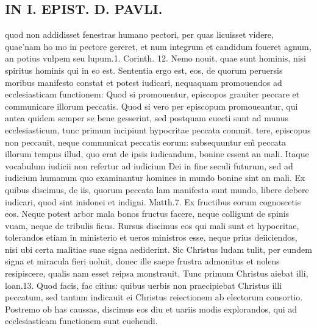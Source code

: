 \documentclass{article}
\begin{document}
\begin{pages}
\section*{IN I. EPIST. D. PAVLI. }
\marginpar{[ p.119 ]}\pstart quod non addidisset fenestras humano pectori, per quas licuisset videre, quae’nam ho mo in pectore gereret, et num integrum et candidum foueret agnum, an potius vulpem seu lupum.1. Corinth. 12. Nemo nouit, quae sunt hominis, nisi spiritus hominis qui in eo est. Sententia ergo est, eos, de quorum peruersis moribus manifesto constat et potest iudicari, nequaquam promouendos ad ecclesiasticam functionem: Quod si promouentur, episcopos grauiter peccare et communicare illorum peccatis. Quod si vero per episcopum promoueantur, qui antea quidem semper se bene gesserint, sed postquam euecti sunt ad munus ecclesiasticum, tunc primum incipiunt hypocritae peccata commit. tere, episcopus non peccauit, neque communicat peccatis eorum: subsequuntur em̃ peccata illorum tempus illud, quo erat de ipsis iudicandum, bonine essent an mali. Itaque vocabulum iudicii non refertur ad iudicium Dei in fine seculi futurum, sed ad iudicium humanum quo examinantur homines in mundo bonine sint an mali. Ex quibus discimus, de iis, quorum peccata lam manifesta sunt mundo, libere debere iudicari, quod sint inidonei et indigni. Matth.7. Ex fructibus eorum cognoscetis eos. Neque potest arbor mala bonos fructus facere, neque colligunt de spinis vuam, neque de tribulis ficus. Rursus discimus eos qui mali sunt et hypocritae, tolerandos etiam in ministerio et ueros ministros esse, neque prius deiiciendos, nisi ubi certa malitiae suae signa aediderint. Sic Christus ludam tulit, per eundem signa et miracula fieri uoluit, donec ille saepe frustra admonitus et nolens resipiscere, qualis nam esset reipsa monstrauit. Tunc primum Christus aiebat illi, loan.13. Quod facis, fac citius: quibus uerbis non praecipiebat Christus illi peccatum, sed tantum indicauit ei Christus reiectionem ab electorum consortio. Postremo ob has caussas, discimus eos diu et uariis modis explorandos, qui ad ecclesiasticam functionem sunt euehendi.  \pend
{}
{}

\end{pages}
\end{document}
